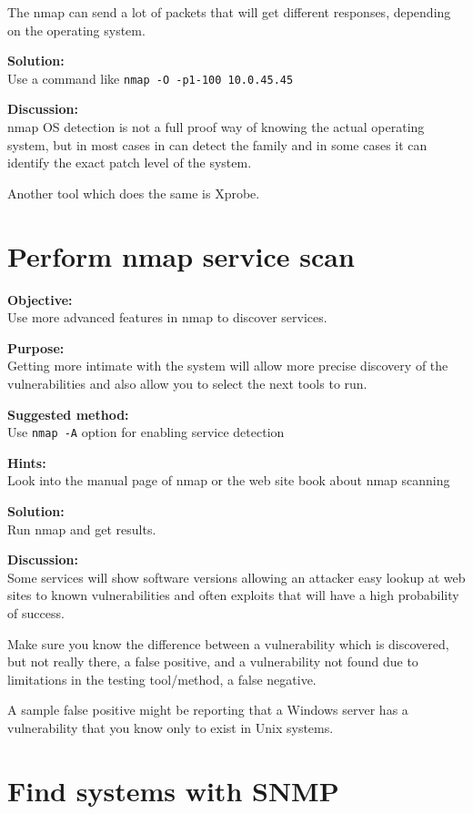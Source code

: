 \documentclass[a4paper,11pt,notitlepage]{report}
\begin{document}
The nmap can send a lot of packets that will get different responses, depending on the operating system.

{\bf Solution:}\\
Use a command like \verb+nmap -O -p1-100 10.0.45.45+


{\bf Discussion:}\\
nmap OS detection is not a full proof way of knowing the actual operating system, but in most cases in can detect the family and in some cases it can identify the exact patch level of the system.

Another tool which does the same is Xprobe.

\chapter{Perform nmap service scan}
\label{ex:nmap-service}

{\bf Objective:} \\
Use more advanced features in nmap to discover services.

{\bf Purpose:}\\
Getting more intimate with the system will allow more precise discovery of the vulnerabilities and also allow you to select the next tools to run.

{\bf Suggested method:}\\
Use \verb+nmap -A+ option for enabling service detection

{\bf Hints:} \\
Look into the manual page of nmap or the web site book about nmap scanning

{\bf Solution:}\\
Run nmap and get results.

{\bf Discussion:}\\

Some services will show software versions allowing an attacker easy lookup at web sites to known vulnerabilities and often exploits that will have a high probability of success.

Make sure you know the difference between a vulnerability which is discovered, but not really there, a false positive, and a vulnerability not found due to limitations in the testing tool/method, a false negative.

A sample false positive might be reporting that a Windows server has a vulnerability that you know only to exist in Unix systems.


\chapter{Find systems with SNMP}
\label{ex:find-snmp}
\end{document}
